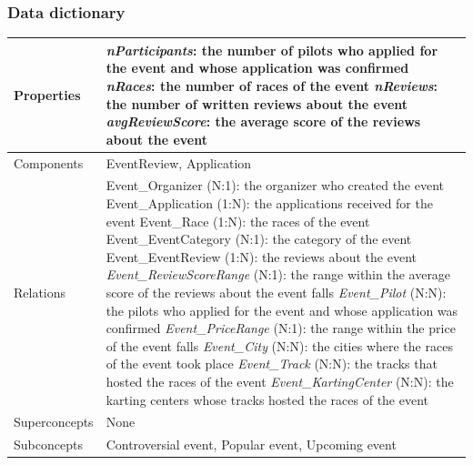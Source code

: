 \documentclass{beamer}
\begin{document}
\begin{frame}
\frametitle{Data dictionary}
\begin{table}
\tiny
\begin{tabular}{|p{2cm}|p{6cm}|}
\hline
Properties & 
\textit{nParticipants}: the number of pilots who applied for the event and whose application was confirmed\newline
\textit{nRaces}: the number of races of the event \newline
\textit{nReviews}: the number of written reviews about the event \newline
\textit{avgReviewScore}: the average score of the reviews about the event \\
\hline
Components & EventReview, Application \\
\hline
Relations &
Event\_Organizer (N:1): the organizer who created the event \newline
Event\_Application (1:N): the applications received for the event \newline
Event\_Race (1:N): the races of the event \newline
Event\_EventCategory (N:1): the category of the event \newline
Event\_EventReview (1:N): the reviews about the event \newline
\textit{Event\_ReviewScoreRange} (N:1): the range within the average score of the reviews about the event falls \newline
\textit{Event\_Pilot} (N:N): the pilots who applied for the event and whose application was confirmed \newline
\textit{Event\_PriceRange} (N:1): the range within the price of the event falls \newline
\textit{Event\_City} (N:N): the cities where the races of the event took place \newline
\textit{Event\_Track} (N:N): the tracks that hosted the races of the event \newline
\textit{Event\_KartingCenter} (N:N): the karting centers whose tracks hosted the races of the event \\
\hline
Superconcepts & None \\
\hline
Subconcepts & Controversial event, Popular event, Upcoming event \\
\hline
\end{tabular}
\end{table}
\end{frame}
\end{document}

